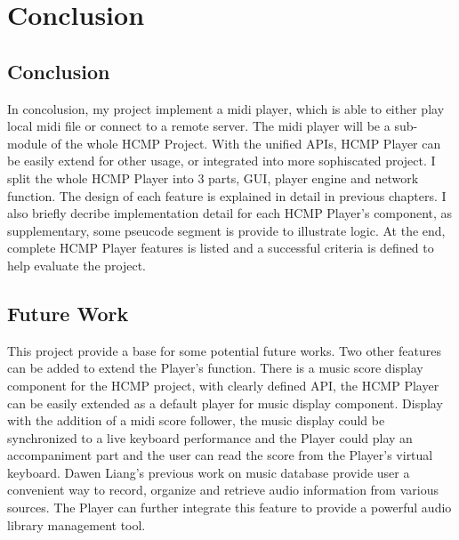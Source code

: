 
\chapter{Conclusion} %



\ifpdf
    \graphicspath{{X/figures/PNG/}{X/figures/PDF/}{X/figures/}}
\else
    \graphicspath{{X/figures/EPS/}{X/figures/}}
\fi


\section{Conclusion}
In concolusion, my project implement a midi player, which is able to 
either play local midi file or connect to a remote server. The midi player  
will be a sub-module of the whole HCMP Project. With the unified APIs,  
HCMP Player can be easily extend for other usage, or integrated into 
more sophiscated project. I split the whole HCMP Player into 3 parts,  
GUI, player engine and network function. The design of each feature  
is explained in detail in previous chapters. I also briefly decribe 
implementation detail for each HCMP Player's component, as supplementary,
some pseucode segment is provide to illustrate logic. At the end, complete 
HCMP Player features is listed and a successful criteria is defined to
help evaluate the project.



\section{Future Work}
This project provide a base for some potential future works. Two other 
features can be added to extend the Player's function. There is a music score display 
component for the HCMP project, with clearly defined API, the HCMP Player can 
be easily extended as a default player for music display component. 
Display with the addition of a midi score follower, 
the music display could be synchronized 
to a live keyboard performance and the Player could play an accompaniment 
part and the user can read the score from the Player's virtual keyboard. 
Dawen Liang's previous work \cite{Dawen:ISMIR2011}on music database provide 
user a convenient way to record, organize
and retrieve audio information from various sources. The Player can further integrate 
this feature to provide a powerful audio library management tool.
